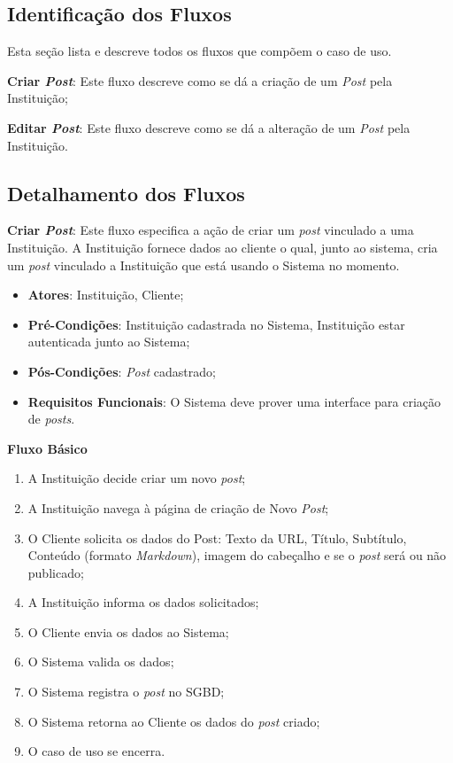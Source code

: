 \begin{anexosenv}
\subsection*{Identificação dos Fluxos}
Esta seção lista e descreve todos os fluxos que compõem o caso de uso.
\begin{lista}
  \item \textbf{Criar \emph{Post}}: Este fluxo descreve como se dá a criação de um \emph{Post} pela Instituição;
  \item \textbf{Editar \emph{Post}}: Este fluxo descreve como se dá a alteração de um \emph{Post} pela Instituição.
\end{lista}

\subsection*{Detalhamento dos Fluxos}
\begin{lista}
  \item \textbf{Criar \emph{Post}}: Este fluxo especifica a ação de criar um \emph{post} vinculado a uma Instituição. A Instituição fornece dados ao cliente o qual, junto ao sistema, cria um \emph{post} vinculado a Instituição que está usando o Sistema no momento.
    \begin{itemize}
    \item \textbf{Atores}: Instituição, Cliente;
    \item \textbf{Pré-Condições}: Instituição cadastrada no Sistema, Instituição estar autenticada junto ao Sistema;
    \item \textbf{Pós-Condições}: \emph{Post} cadastrado;
    \item \textbf{Requisitos Funcionais}: O Sistema deve prover uma interface para criação de \emph{posts}.
    \end{itemize}
	
    \textbf{Fluxo Básico}
    \begin{enumerate}
    \item A Instituição decide criar um novo \emph{post};
    \item A Instituição navega à página de criação de Novo \emph{Post};
    \item O Cliente solicita os dados do Post: Texto da URL, Título, Subtítulo, Conteúdo (formato \emph{Markdown}), imagem do cabeçalho e se o \emph{post} será ou não publicado;
    \item A Instituição informa os dados solicitados;
    \item O Cliente envia os dados ao Sistema;
    \item O Sistema valida os dados;
    \item O Sistema registra o \emph{post} no SGBD;
    \item O Sistema retorna ao Cliente os dados do \emph{post} criado;
    \item O caso de uso se encerra.
    \end{enumerate}
    

\end{lista}
\end{anexosenv}
